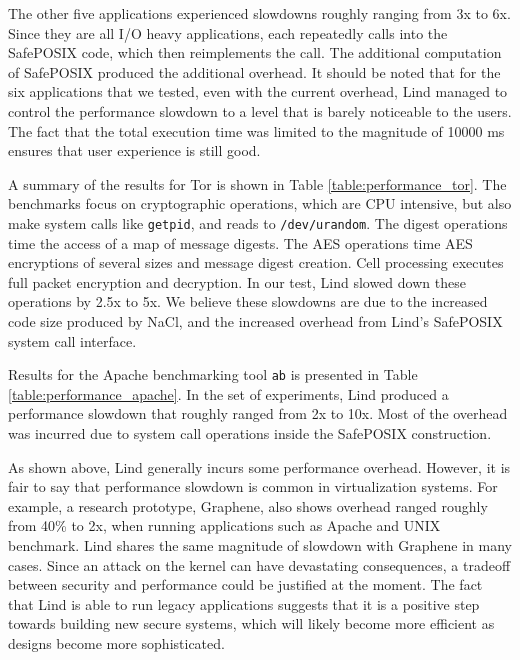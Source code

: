 {{The other five applications experienced slowdowns roughly ranging from 3x to 6x.
Since they are all I/O heavy applications,
each repeatedly calls into the SafePOSIX code, which then reimplements
the call.  The additional computation of SafePOSIX produced the additional
overhead. It should be noted that for the six applications that we tested, even
with the current overhead, Lind managed to control the performance slowdown to a
 level that is barely noticeable to the users.
The fact that the total execution time was limited to the magnitude of 10000 ms ensures that
user experience is still good.

A summary of the results for Tor is shown in Table \ref{table:performance_tor}. The
benchmarks focus on cryptographic operations,
which are CPU intensive, but also make system calls like \texttt{getpid}, and reads to
\texttt{/dev/urandom}.
The digest operations time the access of a map of message digests.
The AES operations time AES encryptions of several sizes and message
digest creation.
Cell processing executes full packet encryption and decryption. In our
test, Lind slowed down these operations by 2.5x to 5x. We believe these
slowdowns are due to the increased code size produced by NaCl,
and the increased overhead from Lind's SafePOSIX system call interface.

Results for the Apache benchmarking tool \texttt{ab} is presented in Table \ref{table:performance_apache}.
In the set of experiments, Lind produced a performance slowdown that roughly
ranged from 2x to 10x. Most of the overhead was incurred due to system call operations inside the
SafePOSIX construction.

As shown above, Lind generally incurs some performance overhead.
However, it is fair to say that performance slowdown is common in virtualization systems.
For example, a research prototype, Graphene, \cite{Graphene-14} also shows overhead ranged roughly from
40\% to 2x, when running applications such as Apache and UNIX benchmark.
Lind shares the same magnitude of slowdown with Graphene in many cases.
Since an attack on the kernel can have devastating
consequences, %
a tradeoff between security and performance could be justified at the moment.
The fact that Lind is able to run
legacy applications
suggests that it
is a positive step towards building new secure systems, which will likely become
more efficient as designs become more sophisticated.

}}
